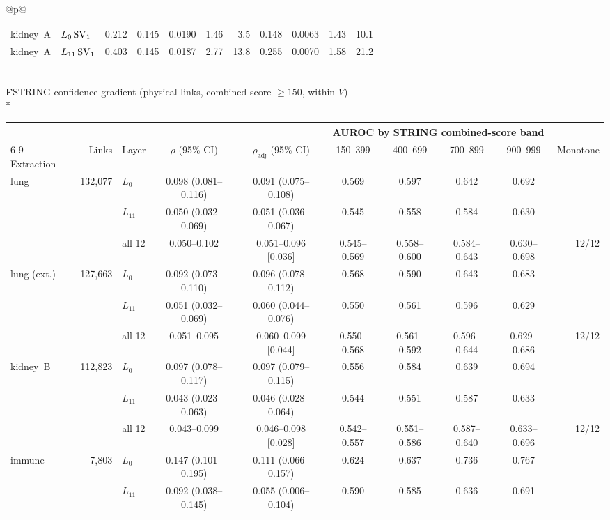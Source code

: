 \begin{longtable}{@{}p{\textwidth}@{}}
{\begin{tabular*}{\textwidth}{@{\extracolsep{\fill}}llrrrrrrrrr@{}}
kidney~A & $L_{0}\,\mathrm{SV}_{1}$ & 0.212 & 0.145 & 0.0190 & 1.46 & 3.5 & 0.148 & 0.0063 & 1.43 & 10.1 \\
kidney~A & $L_{11}\,\mathrm{SV}_{1}$ & 0.403 & 0.145 & 0.0187 & 2.77 & 13.8 & 0.255 & 0.0070 & 1.58 & 21.2 \\
\end{tabular*}}\\
\midrule
\textbf{F}\enspace STRING confidence gradient (physical links, combined score $\geq 150$, within $V$)\\*
{\scriptsize\begin{tabular*}{\textwidth}{@{\extracolsep{\fill}}lrlccccccr@{}}
& & & & & \multicolumn{4}{c}{AUROC by STRING combined-score band} & \\
\cmidrule(lr){6-9}
Extraction & Links & Layer & $\rho$ (95\% CI) & $\rho_{\mathrm{adj}}$ (95\% CI) & 150--399 & 400--699 & 700--899 & 900--999 & Monotone \\
\midrule
lung & 132,077 & $L_{0}$ & 0.098 (0.081--0.116) & 0.091 (0.075--0.108) & 0.569 & 0.597 & 0.642 & 0.692 &  \\
 &  & $L_{11}$ & 0.050 (0.032--0.069) & 0.051 (0.036--0.067) & 0.545 & 0.558 & 0.584 & 0.630 &  \\
 &  & all 12 & 0.050--0.102 & 0.051--0.096 [0.036] & 0.545--0.569 & 0.558--0.600 & 0.584--0.643 & 0.630--0.698 & 12/12 \\
\addlinespace[2pt]
lung (ext.) & 127,663 & $L_{0}$ & 0.092 (0.073--0.110) & 0.096 (0.078--0.112) & 0.568 & 0.590 & 0.643 & 0.683 &  \\
 &  & $L_{11}$ & 0.051 (0.032--0.069) & 0.060 (0.044--0.076) & 0.550 & 0.561 & 0.596 & 0.629 &  \\
 &  & all 12 & 0.051--0.095 & 0.060--0.099 [0.044] & 0.550--0.568 & 0.561--0.592 & 0.596--0.644 & 0.629--0.686 & 12/12 \\
\addlinespace[2pt]
kidney~B & 112,823 & $L_{0}$ & 0.097 (0.078--0.117) & 0.097 (0.079--0.115) & 0.556 & 0.584 & 0.639 & 0.694 &  \\
 &  & $L_{11}$ & 0.043 (0.023--0.063) & 0.046 (0.028--0.064) & 0.544 & 0.551 & 0.587 & 0.633 &  \\
 &  & all 12 & 0.043--0.099 & 0.046--0.098 [0.028] & 0.542--0.557 & 0.551--0.586 & 0.587--0.640 & 0.633--0.696 & 12/12 \\
\addlinespace[2pt]
immune & 7,803 & $L_{0}$ & 0.147 (0.101--0.195) & 0.111 (0.066--0.157) & 0.624 & 0.637 & 0.736 & 0.767 &  \\
 &  & $L_{11}$ & 0.092 (0.038--0.145) & 0.055 (0.006--0.104) & 0.590 & 0.585 & 0.636 & 0.691 &  \\

\end{tabular*}}
\end{longtable}
